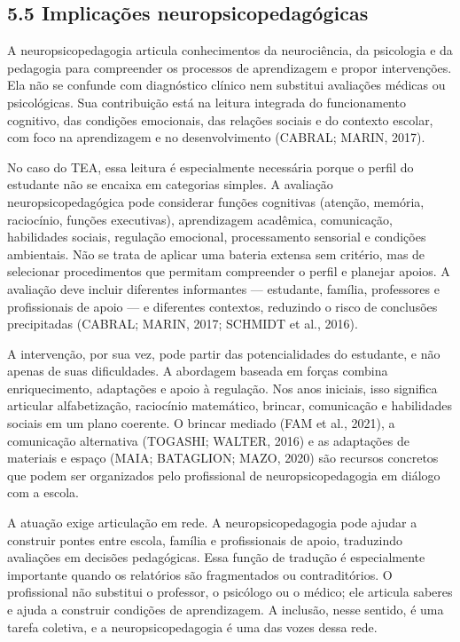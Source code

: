 \subsection{5.5 Implicações
neuropsicopedagógicas}\label{implicauxe7uxf5es-neuropsicopedaguxf3gicas}

A neuropsicopedagogia articula conhecimentos da neurociência, da
psicologia e da pedagogia para compreender os processos de aprendizagem
e propor intervenções. Ela não se confunde com diagnóstico clínico nem
substitui avaliações médicas ou psicológicas. Sua contribuição está na
leitura integrada do funcionamento cognitivo, das condições emocionais,
das relações sociais e do contexto escolar, com foco na aprendizagem e
no desenvolvimento (CABRAL; MARIN, 2017).

No caso do TEA, essa leitura é especialmente necessária porque o perfil
do estudante não se encaixa em categorias simples. A avaliação
neuropsicopedagógica pode considerar funções cognitivas (atenção,
memória, raciocínio, funções executivas), aprendizagem acadêmica,
comunicação, habilidades sociais, regulação emocional, processamento
sensorial e condições ambientais. Não se trata de aplicar uma bateria
extensa sem critério, mas de selecionar procedimentos que permitam
compreender o perfil e planejar apoios. A avaliação deve incluir
diferentes informantes --- estudante, família, professores e
profissionais de apoio --- e diferentes contextos, reduzindo o risco de
conclusões precipitadas (CABRAL; MARIN, 2017; SCHMIDT et al., 2016).

A intervenção, por sua vez, pode partir das potencialidades do
estudante, e não apenas de suas dificuldades. A abordagem baseada em
forças combina enriquecimento, adaptações e apoio à regulação. Nos anos
iniciais, isso significa articular alfabetização, raciocínio matemático,
brincar, comunicação e habilidades sociais em um plano coerente. O
brincar mediado (FAM et al., 2021), a comunicação alternativa (TOGASHI;
WALTER, 2016) e as adaptações de materiais e espaço (MAIA; BATAGLION;
MAZO, 2020) são recursos concretos que podem ser organizados pelo
profissional de neuropsicopedagogia em diálogo com a escola.

A atuação exige articulação em rede. A neuropsicopedagogia pode ajudar a
construir pontes entre escola, família e profissionais de apoio,
traduzindo avaliações em decisões pedagógicas. Essa função de tradução é
especialmente importante quando os relatórios são fragmentados ou
contraditórios. O profissional não substitui o professor, o psicólogo ou
o médico; ele articula saberes e ajuda a construir condições de
aprendizagem. A inclusão, nesse sentido, é uma tarefa coletiva, e a
neuropsicopedagogia é uma das vozes dessa rede.


